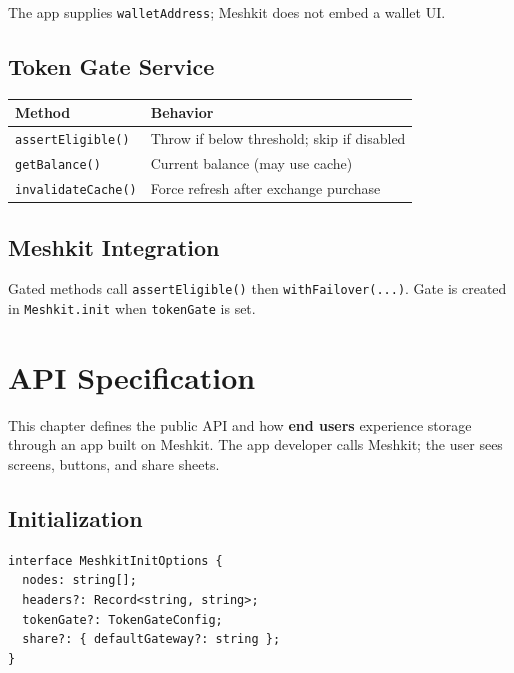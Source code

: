 \documentclass[11pt,a4paper,openany]{report}
\begin{document}
The app supplies \texttt{walletAddress}; Meshkit does not embed a wallet UI.

\section{Token Gate Service}

\begin{center}
\begin{tabular}{@{}ll@{}}
\toprule
\textbf{Method} & \textbf{Behavior} \\
\midrule
\texttt{assertEligible()} & Throw if below threshold; skip if disabled \\
\texttt{getBalance()} & Current balance (may use cache) \\
\texttt{invalidateCache()} & Force refresh after exchange purchase \\
\bottomrule
\end{tabular}
\end{center}

\section{Meshkit Integration}

Gated methods call \texttt{assertEligible()} then \texttt{withFailover(...)}. Gate is created in \texttt{Meshkit.init} when \texttt{tokenGate} is set.

\chapter{API Specification}

This chapter defines the public API and how \textbf{end users} experience storage through an app built on Meshkit. The app developer calls Meshkit; the user sees screens, buttons, and share sheets.

\section{Initialization}

\begin{lstlisting}
interface MeshkitInitOptions {
  nodes: string[];
  headers?: Record<string, string>;
  tokenGate?: TokenGateConfig;
  share?: { defaultGateway?: string };
}
\end{lstlisting}
\end{document}
